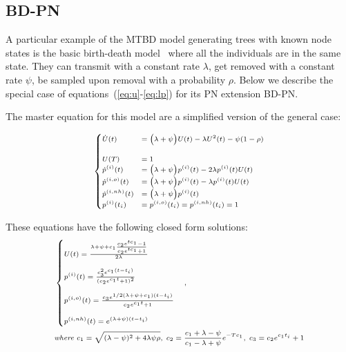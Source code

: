 \documentclass[a4paper,10pt]{article}
\begin{document}
\subsection{BD-PN}
A particular example of the MTBD model generating trees with known node states is the basic birth-death model~\citep{Stadler2009} where all the individuals are in the same state. They can transmit with a constant rate $\lambda$, get removed with a constant rate $\psi$, be sampled upon removal with a probability $\rho$. Below we describe the special case of equations~(\ref{eq:u}-\ref{eq:lp}) for its PN extension BD-PN.

The master equation for this model are a simplified version of the general case:

\begin{equation}
\scriptsize
\begin{cases}
\dot{U}(t) &= \Big(\lambda + \psi\Big) U(t) - \lambda U^2(t) - \psi (1 - \rho)\\\\
U(T) &=  1\\
\dot{p}^{(i)}(t) &=  \Big(\lambda + \psi\Big) p^{(i)}(t) - 2 \lambda p^{(i)}(t)U(t)\\
\dot{p}^{(i,o)}(t) &=  \Big(\lambda + \psi\Big) p^{(i)}(t) - \lambda p^{(i)}(t)U(t)\\
\dot{p}^{(i,nh)}(t) &=  \Big(\lambda + \psi\Big) p^{(i)}(t)\\
p^{(i)}(t_i) &= p^{(i,o)}(t_i) = p^{(i,nh)}(t_i) = 1
\end{cases}
\end{equation}


These equations have the following closed form solutions:
\begin{equation}
\scriptsize
\begin{split}
&\begin{cases}
U(t) = \frac{\lambda + \psi + c_1 \frac{c_2 e^{t c_1} - 1}{c_2 e^{tc_1} + 1}}{2\lambda}\\
\\
p^{(i)}(t) = \frac{c_3^2 e^{c_1 (t - t_i)}}{(c_2e^{c_1 t} + 1)^2} \\
\\
p^{(i,o)}(t) =  \frac{c_3 e^{1/2 (\lambda + \psi + c_1)(t - t_i)}}{c_2e^{c_1 t} + 1} \\
\\
p^{(i,nh)}(t) =  e^{(\lambda + \psi)(t - t_i)}
\end{cases},\\
& \textit{where } c_1 = \sqrt{(\lambda - \psi)^2 + 4 \lambda\psi\rho},\; c_2 = \frac{c_1 + \lambda - \psi}{c_1 - \lambda + \psi}e^{-Tc_1},\; c_3 = c_2 e^{c_1 t_i} + 1
\end{split}
\end{equation}
\end{document}

